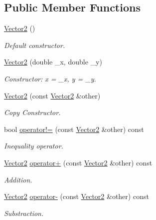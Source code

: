 \subsection*{Public Member Functions}
\begin{DoxyCompactItemize}
\item 
\mbox{\hyperlink{struct_vector2_a22104d1809be26a419ef1f959e3761bf}{Vector2}} ()
\begin{DoxyCompactList}\small\item\em Default constructor. \end{DoxyCompactList}\item 
\mbox{\hyperlink{struct_vector2_a861062b13bd0e92d50b3ffd90c9edd77}{Vector2}} (double \+\_\+x, double \+\_\+y)
\begin{DoxyCompactList}\small\item\em Constructor\+: x = \+\_\+x, y = \+\_\+y. \end{DoxyCompactList}\item 
\mbox{\hyperlink{struct_vector2_ac0c70e89b089fb619dae62c32ccde4ec}{Vector2}} (const \mbox{\hyperlink{struct_vector2}{Vector2}} \&other)
\begin{DoxyCompactList}\small\item\em Copy Constructor. \end{DoxyCompactList}\item 
bool \mbox{\hyperlink{struct_vector2_af3b049c981a79bd60495b6362aa6392b}{operator!=}} (const \mbox{\hyperlink{struct_vector2}{Vector2}} \&other) const
\begin{DoxyCompactList}\small\item\em Inequality operator. \end{DoxyCompactList}\item 
\mbox{\hyperlink{struct_vector2}{Vector2}} \mbox{\hyperlink{struct_vector2_a53bdaa4ea8e1504f8a78ac78e6f151bf}{operator+}} (const \mbox{\hyperlink{struct_vector2}{Vector2}} \&other) const
\begin{DoxyCompactList}\small\item\em Addition. \end{DoxyCompactList}\item 
\mbox{\hyperlink{struct_vector2}{Vector2}} \mbox{\hyperlink{struct_vector2_a9f6650ee1529209532c14fc0e4e97a6a}{operator-\/}} (const \mbox{\hyperlink{struct_vector2}{Vector2}} \&other) const
\begin{DoxyCompactList}\small\item\em Substraction. \end{DoxyCompactList}\item 

\end{DoxyCompactItemize}
